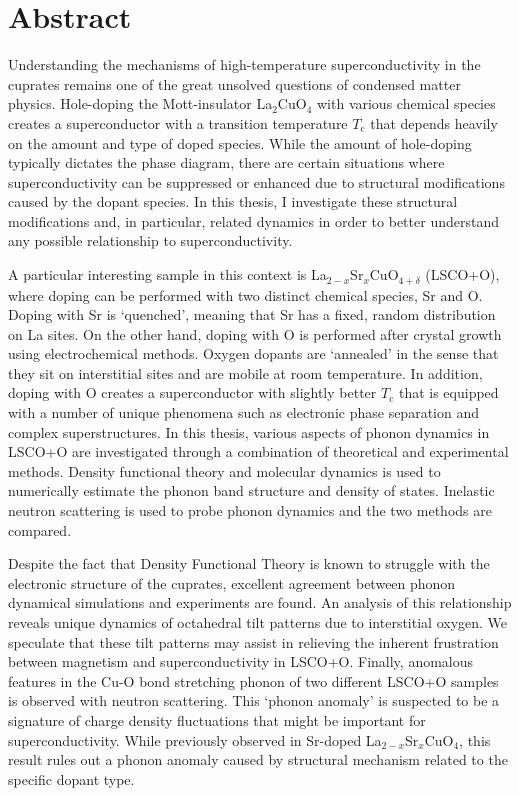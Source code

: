 \chapter*{Abstract}
Understanding the mechanisms of high-temperature superconductivity in the cuprates remains one of the great unsolved questions of condensed matter physics. Hole-doping the Mott-insulator La$_2$CuO$_4$ with various chemical species creates a superconductor with a transition temperature $T_\text{c}$ that depends heavily on the amount and type of doped species. While the amount of hole-doping typically dictates the phase diagram, there are certain situations where superconductivity can be suppressed or enhanced due to structural modifications caused by the dopant species. In this thesis, I investigate these structural modifications and, in particular, related dynamics in order to better understand any possible relationship to superconductivity.

A particular interesting sample in this context is La$_{2-x}$Sr$_x$CuO$_{4+\delta}$ (LSCO+O), where doping can be performed with two distinct chemical species, Sr and O. Doping with Sr is `quenched', meaning that Sr has a fixed, random distribution on La sites. On the other hand, doping with O is performed after crystal growth using electrochemical methods. Oxygen dopants are `annealed' in the sense that they sit on interstitial sites and are mobile at room temperature. In addition, doping with O creates a superconductor with slightly better $T_\text{c}$ that is equipped with a number of unique phenomena such as electronic phase separation and complex superstructures. In this thesis, various aspects of phonon dynamics in LSCO+O are investigated through a combination of theoretical and experimental methods. Density functional theory and molecular dynamics is used to numerically estimate the phonon band structure and density of states. Inelastic neutron scattering is used to probe phonon dynamics and the two methods are compared.

Despite the fact that Density Functional Theory is known to struggle with the electronic structure of the cuprates, excellent agreement between phonon dynamical simulations and experiments are found. An analysis of this relationship reveals unique dynamics of octahedral tilt patterns due to interstitial oxygen. We speculate that these tilt patterns may assist in relieving the inherent frustration between magnetism and superconductivity in LSCO+O. Finally, anomalous features in the Cu-O bond stretching phonon of two different LSCO+O samples is observed with neutron scattering. This `phonon anomaly' is suspected to be a signature of charge density fluctuations that might be important for superconductivity. While previously observed in Sr-doped La$_{2-x}$Sr$_x$CuO$_4$, this result rules out a phonon anomaly caused by structural mechanism related to the specific dopant type.